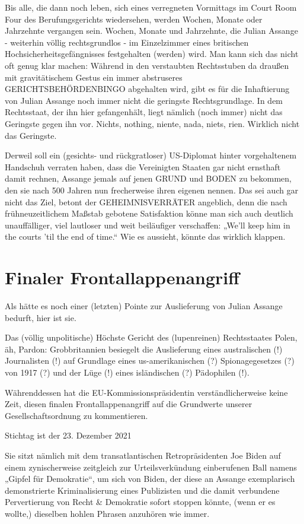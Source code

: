 \begin{multicols}{2}
Bis alle, die dann noch leben, sich eines verregneten
Vormittags im Court Room Four des Berufungsgerichts
wiedersehen, werden Wochen, Monate oder Jahrzehnte
vergangen sein. Wochen, Monate und Jahrzehnte, die
Julian Assange - weiterhin völlig rechtsgrundlos - im
Einzelzimmer eines britischen Hochsicherheitsgefängnisses festgehalten (werden) wird. Man kann sich das
nicht oft genug klar machen: Während in den verstaubten Rechtsstuben da draußen mit gravitätischem Gestus
ein immer abstruseres GERICHTSBEHÖRDENBINGO
abgehalten wird, gibt es für die Inhaftierung von Julian
Assange noch immer nicht die geringste Rechtsgrundlage. In dem Rechtsstaat, der ihn hier gefangenhält, liegt
nämlich (noch immer) nicht das Geringste gegen ihn
vor. Nichts, nothing, niente, nada, niets, rien. Wirklich
nicht das Geringste.

Derweil soll ein (gesichts- und rückgratloser) US-Diplomat hinter vorgehaltenem Handschuh verraten haben,
dass die Vereinigten Staaten gar nicht ernsthaft damit
rechnen, Assange jemals auf jenen GRUND und BODEN
zu bekommen, den sie nach 500 Jahren nun frecherweise ihren eigenen nennen. Das sei auch gar nicht das Ziel,
betont der GEHEIMNISVERRÄTER angeblich, denn die
nach frühneuzeitlichem Maßstab gebotene Satisfaktion
könne man sich auch deutlich unauffälliger, viel lautloser und weit beiläufiger verschaffen: „We’ll keep him in
the courts ’til the end of time.“
Wie es aussieht, könnte das wirklich klappen.

\section{Finaler Frontallappenangriff} %
Als hätte es noch einer (letzten) Pointe zur Auslieferung
von Julian Assange bedurft, hier ist sie.

Das (völlig unpolitische) Höchste Gericht des (lupenreinen) Rechtsstaates Polen, äh, Pardon: Grobbritannien
besiegelt die Auslieferung eines australischen (!) Journalisten (!) auf Grundlage eines us-amerikanischen (?)
Spionagegesetzes (?) von 1917 (?) und der Lüge (!) eines
isländischen (?) Pädophilen (!).

Währenddessen hat die EU-Kommissionspräsidentin
verständlicherweise keine Zeit, diesen finalen Frontallappenangriff auf die Grundwerte unserer Gesellschaftsordnung zu kommentieren.

Stichtag ist der 23. Dezember 2021 %

Sie sitzt nämlich mit dem transatlantischen Retropräsidenten Joe Biden auf einem zynischerweise zeitgleich
zur Urteilsverkündung einberufenen Ball namens „Gipfel für Demokratie“, um sich von Biden, der diese an
Assange exemplarisch demonstrierte Kriminalisierung
eines Publizisten und die damit verbundene Pervertierung von Recht \& Demokratie sofort stoppen könnte,
(wenn er es wollte,) dieselben hohlen Phrasen anzuhören wie immer.


\end{multicols}
